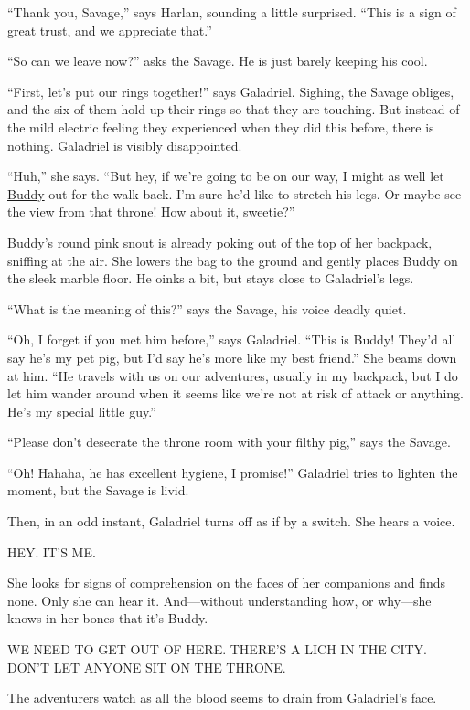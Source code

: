 \documentclass[smalldemyvopaper,11pt,twoside,onecolumn,openright,extrafontsizes]{memoir}
\begin{document}
``Thank you, Savage,'' says Harlan, sounding a little surprised. ``This
is a sign of great trust, and we appreciate that.''

``So can we leave now?'' asks the Savage. He is just barely keeping his
cool.

``First, let's put our rings together!'' says Galadriel. Sighing, the
Savage obliges, and the six of them hold up their rings so that they are
touching. But instead of the mild electric feeling they experienced when
they did this before, there is nothing. Galadriel is visibly
disappointed.

``Huh,'' she says. ``But hey, if we're going to be on our way, I might
as well let \href{/characters/buddy/}{Buddy} out for the walk back. I'm
sure he'd like to stretch his legs. Or maybe see the view from that
throne! How about it, sweetie?''

Buddy's round pink snout is already poking out of the top of her
backpack, sniffing at the air. She lowers the bag to the ground and
gently places Buddy on the sleek marble floor. He oinks a bit, but stays
close to Galadriel's legs.

``What is the meaning of this?'' says the Savage, his voice deadly
quiet.

``Oh, I forget if you met him before,'' says Galadriel. ``This is Buddy!
They'd all say he's my pet pig, but I'd say he's more like my best
friend.'' She beams down at him. ``He travels with us on our adventures,
usually in my backpack, but I do let him wander around when it seems
like we're not at risk of attack or anything. He's my special little
guy.''

``Please don't desecrate the throne room with your filthy pig,'' says
the Savage.

``Oh! Hahaha, he has excellent hygiene, I promise!'' Galadriel tries to
lighten the moment, but the Savage is livid.

Then, in an odd instant, Galadriel turns off as if by a switch. She
hears a voice.

HEY. IT'S ME.

She looks for signs of comprehension on the faces of her companions and
finds none. Only she can hear it. And---without understanding how, or
why---she knows in her bones that it's Buddy.

WE NEED TO GET OUT OF HERE. THERE'S A LICH IN THE CITY. DON'T LET ANYONE
SIT ON THE THRONE.

The adventurers watch as all the blood seems to drain from Galadriel's
face.
\end{document}
